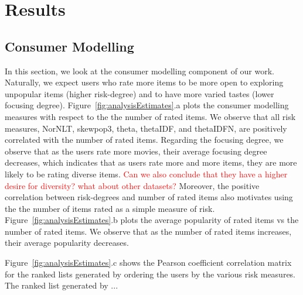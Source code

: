 \iffalse
\section{Results}
\subsection{Consumer Modelling} In this section, we look at the consumer modelling component of our work. 
Naturally, we expect users who rate more items to be more open to exploring unpopular items (higher risk-degree) and to have more varied tastes (lower focusing degree).  Figure~\ref{fig:analysisEstimates}.a plots the consumer modelling measures with respect to the the number of rated items. We observe that all risk measures, NorNLT, skewpop3, theta, thetaIDF, and thetaIDFN, are positively correlated with the number of rated items. Regarding the focusing degree, we observe that  as the users rate more movies, their average focusing degree decreases, which indicates that as users rate more and more items, they are  more likely to be rating diverse items.  \textcolor{red}{Can we also conclude that they have a higher desire for diversity? what about other datasets?} Moreover, the positive correlation  between risk-degrees and number of rated items also motivates using the  the number of items rated as a simple measure of risk. Figure~\ref{fig:analysisEstimates}.b  plots the average popularity of rated items   vs the number of rated items. We observe that as the number of rated items increases, their average popularity decreases.

 Figure~\ref{fig:analysisEstimates}.c shows the Pearson coefficient correlation matrix for  the ranked lists generated by  ordering the users by the various risk measures. The ranked list generated by ...

\begin{figure*}[htb]
\centering
{}
\caption{analysis of estimated params}
\label{fig:analysisEstimates}
\end{figure*}


